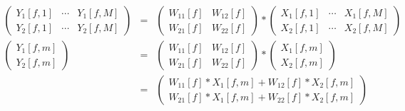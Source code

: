 \documentclass[a4j]{jarticle}
\begin{document}
\begin{eqnarray}
\left(
 \begin{array}{ccc}
  Y_1[f,1] & \cdots & Y_1[f,M]\\
  Y_2[f,1] & \cdots & Y_2[f,M]
 \end{array}
\right) &=& 
\left(
\begin{array}{cc}
 W_{11}[f]&W_{12}[f] \\
 W_{21}[f]&W_{22}[f]
\end{array}
\right) * 
\left(
 \begin{array}{ccc}
  X_1[f,1] & \cdots & X_1[f,M]\\
  X_2[f,1] & \cdots & X_2[f,M]
 \end{array}
\right) \\
\left(
 \begin{array}{ccc}
  Y_1[f,m]\\
  Y_2[f,m]
 \end{array}
\right) &=& 
\left(
\begin{array}{cc}
 W_{11}[f]&W_{12}[f] \\
 W_{21}[f]&W_{22}[f]
\end{array}
\right) * 
\left(
 \begin{array}{ccc}
  X_1[f,m]\\
  X_2[f,m]
 \end{array}
\right) \\
&=&
\left(
 \begin{array}{ccc}
  W_{11}[f] * X_1[f,m] + W_{12}[f] * X_2[f,m]\\
  W_{21}[f] * X_1[f,m] + W_{22}[f] * X_2[f,m]
 \end{array}
\right) \nonumber
\end{eqnarray}
\end{document}
